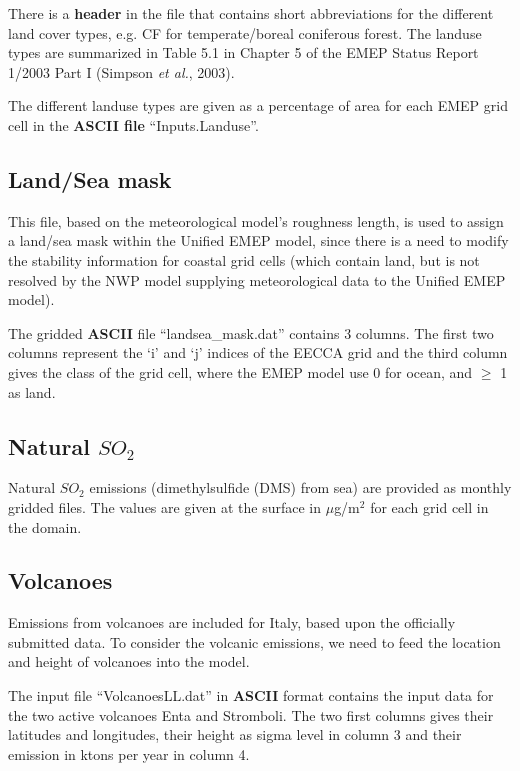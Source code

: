 There is a {\bf header} in the file that contains short abbreviations 
for the different land cover
types, e.g. CF for temperate/boreal coniferous forest. The landuse
types are summarized in Table 5.1 in Chapter 5 of the EMEP Status
Report 1/2003 Part I (Simpson {\sl et al.}, 2003).

The different landuse types are given as a percentage of area for each 
EMEP grid cell in the {\bf ASCII file} ``Inputs.Landuse''. 



\subsection{Land/Sea mask}
This file, based on the meteorological model's roughness length, is used
to assign a land/sea mask within the Unified EMEP model, since there is
a need to modify the stability information for coastal grid cells
(which contain land, but is not resolved by the NWP model supplying 
meteorological data to the Unified EMEP model). 

The gridded {\bf ASCII} file ``landsea\_mask.dat'' contains 3 columns. 
The first two columns represent the `i' and `j' indices of the EECCA
grid and the third column gives the class of the grid cell, where the 
EMEP model use 0 for ocean, and $\geq$ 1 as land.



\subsection{Natural $SO_2$}
Natural $SO_2$ emissions (dimethylsulfide (DMS) from sea) are provided 
as monthly gridded files.  
The values are given at the surface in $\mu$g/m$^2$ for each grid cell in the domain. 

\subsection{Volcanoes}

Emissions from volcanoes are included for Italy, based upon the
officially submitted data.
To consider the volcanic emissions, we need to feed the location
and height of volcanoes into the model. 

The input file ``VolcanoesLL.dat'' in {\bf ASCII} format contains the input data for the two active volcanoes
 Enta and Stromboli. The two first columns gives their latitudes and longitudes, their height as sigma level
 in column 3 and their emission in ktons per year in column 4. 

